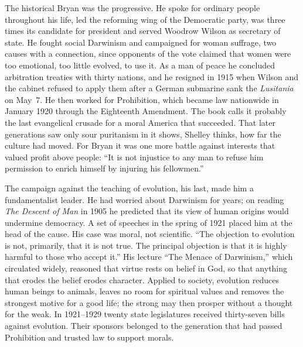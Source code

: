 The historical Bryan was the progressive. He spoke for ordinary people throughout his life, led the
reforming wing of the Democratic party, was three times its candidate for president and served
Woodrow Wilson as secretary of state. He fought social Darwinism and campaigned for woman suffrage,
two causes with a connection, since opponents of the vote claimed that women were too emotional, too
little evolved, to use it. As a man of peace he concluded arbitration treaties with thirty nations,
and he resigned in 1915 when Wilson and the cabinet refused to apply them after a German submarine
sank the \emph{Lusitania} on May~7. He then worked for Prohibition, which became law nationwide in
January 1920 through the Eighteenth Amendment. The book calls it probably the last evangelical
crusade for a moral America that succeeded. That later generations saw only sour puritanism in it
shows, Shelley thinks, how far the culture had moved. For Bryan it was one more battle against
interests that valued profit above people: ``It is not injustice to any man to refuse him permission
to enrich himself by injuring his fellowmen.''

The campaign against the teaching of evolution, his last, made him a fundamentalist leader. He had
worried about Darwinism for years; on reading \emph{The Descent of Man} in 1905 he predicted that its
view of human origins would undermine democracy. A set of speeches in the spring of 1921 placed him
at the head of the cause. His case was moral, not scientific. ``The objection to evolution is not,
primarily, that it is not true. The principal objection is that it is highly harmful to those who
accept it.'' His lecture ``The Menace of Darwinism,'' which circulated widely, reasoned that virtue
rests on belief in God, so that anything that erodes the belief erodes character. Applied to society,
evolution reduces human beings to animals, leaves no room for spiritual values and removes the
strongest motive for a good life; the strong may then prosper without a thought for the weak. In
1921--1929 twenty state legislatures received thirty-seven bills against evolution. Their sponsors
belonged to the generation that had passed Prohibition and trusted law to support morals.

